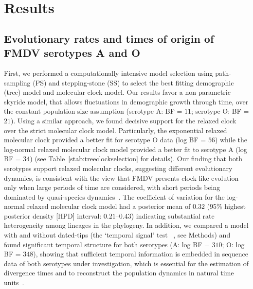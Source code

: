 \documentclass[10pt]{article}
\begin{document}
\section*{Results}

\subsection*{Evolutionary rates and times of origin of FMDV serotypes A and O}

First, we performed a computationally intensive model selection using path-sampling (PS) and stepping-stone (SS) to select the best fitting demographic (tree) model and molecular clock model.
Our results favor a non-parametric skyride model, that allows fluctuations in demographic growth through time, over the constant population size assumption (serotype A: BF = $11$; serotype O: BF = $21$).
Using a similar approach, we  found decisive support for the relaxed clock over the strict molecular clock model.
Particularly, the exponential relaxed molecular clock provided a better fit for serotype O data (log BF = $56$) while the log-normal relaxed molecular clock model provided a better fit to serotype A (log BF = $34$) (see Table~\ref{stab:treeclockselection} for details). 
Our finding that both serotypes support relaxed molecular clocks, suggesting different evolutionary dynamics, is consistent with the view that FMDV presents clock-like evolution only when large periods of time are considered, with short periods being dominated by quasi-species dynamics~\cite{Muellner2011}.  
The coefficient of variation for the log-normal relaxed molecular clock model had a posterior mean of $0.32$ (95\% highest posterior density [HPD] interval: $0.21$--$0.43$) indicating substantial rate heterogeneity among lineages in the phylogeny.
In addition, we compared a model with and without dated-tips (the `temporal signal' test~\cite{Faria2012} , see Methods) and found significant temporal structure for both serotypes (A: log BF = $310$; O: log BF = $348$), showing that sufficient temporal information is embedded in sequence data of both serotypes under investigation, which is essential for the estimation of divergence times and to reconstruct the population dynamics in natural time units~\cite{MEP}. 
\end{document}
